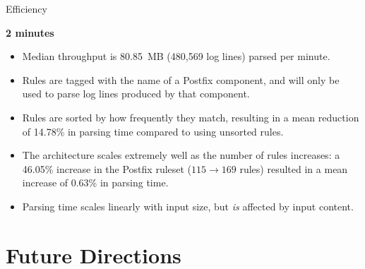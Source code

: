 \documentclass{beamer}
\newcommand{\timingnote}[1]{%
    \textbf{#1}%
}
\begin{document}
\begin{frame}{Efficiency}

    \timingnote{2 minutes}

    \begin{itemize}

        \item Median throughput is 80.85~MB (480,569 log lines) parsed per
            minute.

        \item Rules are tagged with the name of a Postfix component, and
            will only be used to parse log lines produced by that
            component.

        \item Rules are sorted by how frequently they match, resulting in a
            mean reduction of 14.78\% in parsing time compared to using
            unsorted rules.

        \item The architecture scales extremely well as the number of rules
            increases: a 46.05\% increase in the Postfix ruleset ($115
            \rightarrow{} 169$ rules) resulted in a mean increase of 0.63\%
            in parsing time.

        \item Parsing time scales linearly with input size, but
            \textit{is\/} affected by input content.

    \end{itemize}

\end{frame}

\section{Future Directions}
\end{document}
